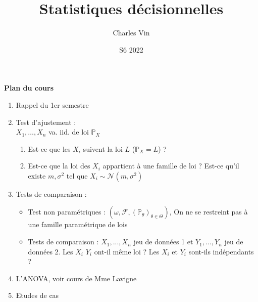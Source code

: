 \documentclass{article}
\title{Statistiques décisionnelles}
\author{Charles Vin}
\date{S6 2022}
\theoremstyle{plain}%
\theoremstyle{definition}
\theoremstyle{remark}
\begin{document}
\maketitle

\textbf{\large Plan du cours}
\begin{enumerate}
    \item Rappel du 1er semestre
    \item Test d'ajustement : \\ 
        $ X_1, \dots, X_n $ va. iid. de loi $ \mathbb{P}_X $ 
        \begin{enumerate}
            \item Est-ce que les $ X_i $ suivent la loi $ L $ ($ \mathbb{P}_X = L $) ?  
            \item Est-ce que la loi des $ X_i $ appartient à une famille de loi ? Est-ce qu'il existe $ m, \sigma ^2 $ tel que $ X_i \sim \mathcal{N}(m, \sigma ^2) $ 
        \end{enumerate}
    \item Tests de comparaison : 
        \begin{itemize}
            \item Test non paramétriques : $ (\omega , \mathcal{F}, (\mathbb{P}_\theta )_{\theta \in \Theta}) $, On ne se restreint pas à une famille paramétrique de lois
            \item Tests de comparaison : $ X_1, ..., X_n $ jeu de données 1 et $ Y_1, ..., Y_n $ jeu de données 2. Les $ X_i $ $ Y_i $ ont-il même loi ? Les $ X_i $ et $ Y_i $ sont-ils indépendants ?
        \end{itemize}    
    \item L'ANOVA, voir cours de Mme Lavigne
    \item Etudes de cas
\end{enumerate}

\tableofcontents
\newpage
\end{document}
